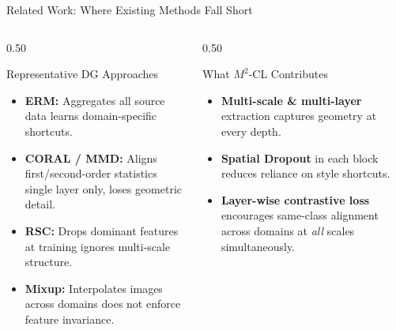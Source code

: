 \documentclass[t, aspectratio=169]{beamer} %
\begin{document}
	\begin{frame}{Related Work: Where Existing Methods Fall Short}
		\begin{columns}[T]
			\begin{column}{0.50\textwidth}
				\begin{block}{Representative DG Approaches}
					\begin{itemize}
						\item \textbf{ERM:} Aggregates all source data learns domain-specific shortcuts.
						\item \textbf{CORAL / MMD:} Aligns first/second-order statistics \alert{single layer only}, loses geometric detail.
						\item \textbf{RSC:} Drops dominant features at training ignores multi-scale structure.
						\item \textbf{Mixup:} Interpolates images across domains does not enforce feature invariance.
					\end{itemize}
				\end{block}
			\end{column}
			\begin{column}{0.50\textwidth}
				\begin{alertblock}{What $M^2$-CL Contributes}
					\begin{itemize}
						\item \textbf{Multi-scale \& multi-layer} extraction captures geometry at every depth.
						\item \textbf{Spatial Dropout} in each block reduces reliance on style shortcuts.
						\item \textbf{Layer-wise contrastive loss} encourages same-class alignment across domains at \emph{all} scales simultaneously.
					\end{itemize}
				\end{alertblock}
			\end{column}
		\end{columns}
	\end{frame}
\end{document}
